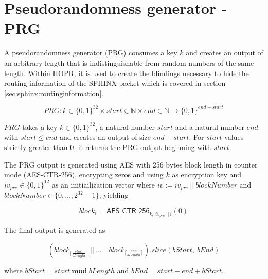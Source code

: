 \section{Pseudorandomness generator - PRG}
\label{appendix:prg}

A pseudorandomness generator (PRG) consumes a key $k$ and creates an output of an arbitrary length that is indistinguishable from random numbers of the same length. Within HOPR, it is used to create the blindings necessary to hide the routing information of the SPHINX packet which is covered in section \ref{sec:sphinx:routinginformation}.

$$ PRG : k \in \{ 0,1 \}^{32} \times start \in \mathbb{N} \times end \in \mathbb{N} \mapsto \{ 0,1 \}^{end - start} $$

$PRG$ takes a key $k \in \{ 0,1 \}^{32}$, a natural number $start$ and a natural number $end$ with $start \le end$ and creates an output of size $end - start$. For $start$ values strictly greater than $0$, it returns the PRG output beginning with $start$.

The PRG output is generated using AES with 256 bytes block length in counter mode (AES-CTR-256), encrypting zeros and using $k$ as encryption key and $iv_{pre} \in \{ 0, 1 \}^{12}$ as an initiailization vector where $iv := iv_{pre} \ || \ blockNumber$ and $blockNumber \in \{ 0, \dots, 2^{32} - 1 \}$, yielding

$$ block_i = \mathsf{AES\_CTR\_256}_{k, \ iv_{pre} \ || \ i}(0) $$

The final output is generated as

$$ ( block_{\lfloor \frac{start}{bLength}\rfloor} \ || \ \dots \ || \ block_{\lceil \frac{end}{bLength}\rceil} ).slice(bStart, \ bEnd)$$

where $bStart=start \ \textbf{mod} \ bLength$ and $bEnd = start - end + bStart$.

